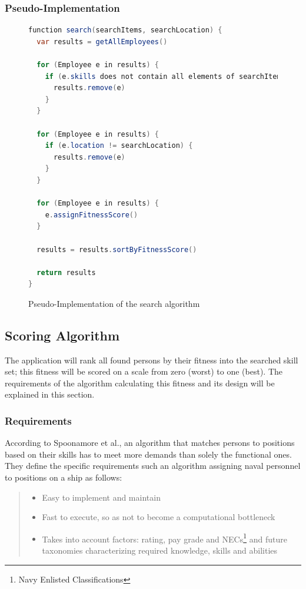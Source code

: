 \newpage

\subsubsection{Pseudo-Implementation}
\begin{figure}[!htp]
\begin{lstlisting}[language=Java]
function search(searchItems, searchLocation) {
  var results = getAllEmployees()

  for (Employee e in results) {
    if (e.skills does not contain all elements of searchItems) {
      results.remove(e)
    }
  }

  for (Employee e in results) {
    if (e.location != searchLocation) {
      results.remove(e)
    }
  }

  for (Employee e in results) {
    e.assignFitnessScore()
  }

  results = results.sortByFitnessScore()

  return results
}
\end{lstlisting}
\caption[Pseudocode: Search Algorithm]{Pseudo-Implementation of the search algorithm}
\end{figure}

\newpage

\subsection{Scoring Algorithm}
\label{fitscorealg}
The application will rank all found persons by their fitness into the searched skill set; this fitness will be scored on a scale from zero (worst) to one (best).
The requirements of the algorithm calculating this fitness and its design will be explained in this section.

\subsubsection{Requirements}
According to Spoonamore et al., an algorithm that matches persons to positions based on their skills has to meet more demands than solely the functional ones. They define the specific requirements such an algorithm assigning naval personnel to positions on a ship as follows:
\blockquote{
\begin{itemize}
  \item Easy to implement and maintain
  \item Fast to execute, so as not to become a computational bottleneck
  \item Takes into account factors: rating, pay grade and NECs\footnote{Navy Enlisted Classifications} and future taxonomies characterizing required knowledge, skills and abilities
\end{itemize}
}
\cite[P. 14]{USN}

